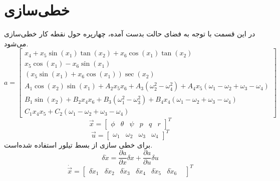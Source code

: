 \section{خطی‌سازی}
در این قسمت با توجه به فضای حالت بدست آمده، چهارپره حول نقطه کار خطی‌سازی می‌شود.
\begin{equation*}
	a = \begin{bmatrix}
		x_4 + x_5\sin(x_1)\tan(x_2) + x_6\cos(x_1)\tan(x_2)\\
		x_5\cos(x_1)- x_6\sin(x_1)\\
		(x_5\sin(x_1) + x_6\cos(x_1))\sec(x_2)\\
		A_1\cos(x_2)\sin(x_1) + 
		A_2x_5x_6 + A_3\left(\omega_2^2-\omega_4^2\right)+
		A_4x_5\left(\omega_1-\omega_2+\omega_3-\omega_4\right)\\
		B_1\sin(x_2) + 
		B_2x_4x_6 + B_3\left(\omega_1^2-\omega_3^2\right)+
		B_4x_4\left(\omega_1-\omega_2+\omega_3-\omega_4\right)\\
		C_1x_4x_5 + 
		C_2\left(\omega_1-\omega_2+\omega_3-\omega_4\right)
	\end{bmatrix}
\end{equation*} 
\begin{equation}
	\vec{x} = \begin{bmatrix}
		\phi& \theta & \psi & p& q& r
	\end{bmatrix}^T
\end{equation}
\begin{equation}
	\vec{u} = \begin{bmatrix}
		\omega_1&\omega_2&\omega_3&\omega_4
	\end{bmatrix}^T
\end{equation}
برای خطی سازی از بسط تیلور استفاده شده‌است.
\begin{equation}
	\delta \dot x = \dfrac{\partial a}{\partial x}\delta x + \dfrac{\partial a}{\partial u}\delta u 
\end{equation}
\begin{equation}
	\dot{\vec{x}} =
	\begin{bmatrix}
		\delta \dot x_1&
		\delta \dot x_2&
		\delta \dot x_3&
		\delta \dot x_4&
		\delta \dot x_5&
		\delta \dot x_6&
	\end{bmatrix}^T
\end{equation}

